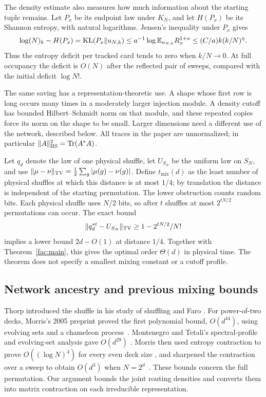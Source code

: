 The density estimate also measures how much information about the
starting tuple remains. Let $P_x$ be its endpoint law under $K_N$, and
let $H(P_x)$ be its Shannon entropy, with natural logarithms. Jensen's
inequality under $P_x$ gives
\[
 \log (N)_k-H(P_x)=\operatorname{KL}(P_x\|u_{N,k})
 \le a^{-1}\log\mathbb E_{u_{N,k}}R_x^{1+a}
 \le (C/a)k(k/N)^\eta.
\]
Thus the entropy deficit per tracked card tends to zero when $k/N\to0$.
At full occupancy the deficit is $O(N)$ after the reflected pair of
sweeps, compared with the initial deficit $\log N!$.

The same saving has a representation-theoretic use. A shape whose first
row is long occurs many times in a moderately larger injection module.
A density cutoff has bounded Hilbert--Schmidt norm on that module, and
these repeated copies force its norm on the shape to be small. Larger
dimensions need a different use of the network, described below. All
traces in the paper are unnormalized; in particular
$\|A\|_{\mathrm{HS}}^2=\operatorname{Tr}(A^*A)$.

Let $q_d$ denote the law of one physical shuffle, let $U_{S_N}$ be the uniform law on $S_N$, and use $\|\mu-\nu\|_{\mathrm{TV}}=\frac12\sum_g|\mu(g)-\nu(g)|$. Define $t_{\mathrm{mix}}(d)$ as the least number of physical shuffles at which this distance is at most $1/4$; by translation the distance is independent of the starting permutation. The lower obstruction counts random bits. Each physical shuffle uses
$N/2$ bits, so after $t$ shuffles at most $2^{tN/2}$ permutations can
occur. The exact bound
\[
 \|q_d^{*t}-U_{S_N}\|_{\mathrm{TV}}\ge1-2^{tN/2}/N!
\]
implies a lower bound $2d-O(1)$ at distance $1/4$.
Together with Theorem~\ref{fac:main}, this gives the optimal order
$\Theta(d)$ in physical time. The theorem does not specify a smallest
mixing constant or a cutoff profile.

\subsection{Network ancestry and previous mixing bounds}
Thorp introduced the shuffle in his study of shuffling and Faro
\cite{Thorp1973}. For power-of-two decks, Morris's 2005 preprint proved
the first polynomial bound, $O(d^{44})$, using evolving sets and a
chameleon process~\cite{Morris2008}. Montenegro and Tetali's
spectral-profile and evolving-set analysis gave $O(d^{29})$
\cite[Theorems 6.14--6.15]{MontenegroTetali2006}. Morris then used
entropy contraction to prove $O((\log N)^4)$ for every even deck size
\cite{Morris2009}, and sharpened the contraction over a sweep to obtain
$O(d^3)$ when $N=2^d$~\cite[Lemma 7 and Theorem 8]{Morris2013}.
These bounds concern the full permutation. Our argument bounds the
joint routing densities and converts them into matrix contraction on
each irreducible representation.

